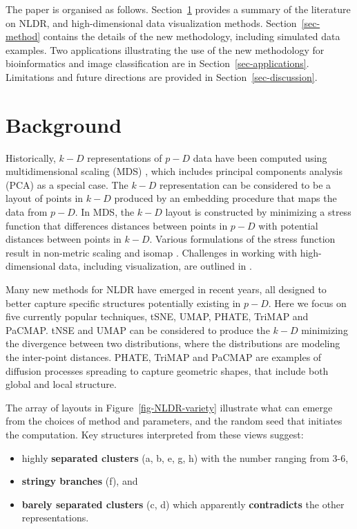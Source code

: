 \documentclass[
  12pt]{article}
\providecommand{\tightlist}{%
  \setlength{\itemsep}{0pt}\setlength{\parskip}{0pt}}\usepackage{longtable,booktabs,array}
\begin{document}
The paper is organised as follows. Section~\ref{sec-background} provides
a summary of the literature on NLDR, and high-dimensional data
visualization methods. Section~\ref{sec-method} contains the details of
the new methodology, including simulated data examples. Two applications
illustrating the use of the new methodology for bioinformatics and image
classification are in Section~\ref{sec-applications}. Limitations and
future directions are provided in Section~\ref{sec-discussion}.

\section{Background}\label{sec-background}

Historically, \(k-D\) representations of \(p-D\) data have been computed
using multidimensional scaling (MDS) \citep{borg2005}, which includes
principal components analysis (PCA) \citep{jolliffe2011} as a special
case. The \(k-D\) representation can be considered to be a layout of
points in \(k-D\) produced by an embedding procedure that maps the data
from \(p-D\). In MDS, the \(k-D\) layout is constructed by minimizing a
stress function that differences distances between points in \(p-D\)
with potential distances between points in \(k-D\). Various formulations
of the stress function result in non-metric scaling \citep{saeed2018}
and isomap \citep{silva2002}. Challenges in working with
high-dimensional data, including visualization, are outlined in
\citet{johnstone2009}.

Many new methods for NLDR have emerged in recent years, all designed to
better capture specific structures potentially existing in \(p-D\). Here
we focus on five currently popular techniques, tSNE, UMAP, PHATE, TriMAP
and PaCMAP. tNSE and UMAP can be considered to produce the \(k-D\)
minimizing the divergence between two distributions, where the
distributions are modeling the inter-point distances. PHATE, TriMAP and
PaCMAP are examples of diffusion processes \citep{article64} spreading
to capture geometric shapes, that include both global and local
structure.

The array of layouts in Figure~\ref{fig-NLDR-variety} illustrate what
can emerge from the choices of method and parameters, and the random
seed that initiates the computation. Key structures interpreted from
these views suggest:

\begin{itemize}
\tightlist
\item
  highly \textbf{separated clusters} (a, b, e, g, h) with the number
  ranging from 3-6,
\item
  \textbf{stringy branches} (f), and
\item
  \textbf{barely separated clusters} (c, d) which apparently
  \textbf{contradicts} the other representations.
\end{itemize}
\end{document}
